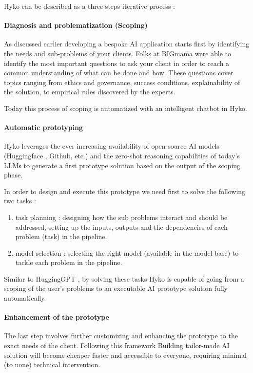 \documentclass[a4paper,12pt]{article}
\begin{document}
Hyko can be described as a three steps iterative process :

\paragraph{Diagnosis and problematization (Scoping)}
As discussed earlier developing a bespoke AI application starts first by identifying the needs and sub-problems of your clients. 
Folks at BIGmama were able to identify the most important questions to ask your client in order to reach a common understanding of what can be done and how.
These questions cover topics ranging from ethics and governance, success conditions, explainability of the solution, to empirical rules discovered by the experts.

Today this process of scoping is automatized with an intelligent chatbot in Hyko. 

\paragraph{Automatic prototyping}
Hyko leverages the ever increasing availability of open-source AI models (Huggingface \cite{huggingface}, Github, etc.)
and the zero-shot reasoning capabilities \cite{zeroshot} of today's LLMs to generate a first prototype solution based on the output of the scoping phase.  

In order to design and execute this prototype we need first to solve the following two tasks : 

\begin{enumerate}
	\item task planning : designing how the sub problems interact and should be addressed, setting up the inputs, outputs and the dependencies of each problem (task) in the pipeline.
	\item model selection : selecting the right model (available in the model base) to tackle each problem in the pipeline.
\end{enumerate}

Similar to HuggingGPT \cite{hugginggpt}, by solving these tasks Hyko is capable of going from a scoping of the user's problems to 
an executable AI prototype solution fully automatically.


\paragraph{Enhancement of the prototype}
The last step involves further customizing and enhancing the prototype to the exact needs of the client.
Following this framework Building tailor-made AI solution will become cheaper faster and accessible to everyone, requiring minimal (to none) technical intervention.
\end{document}
